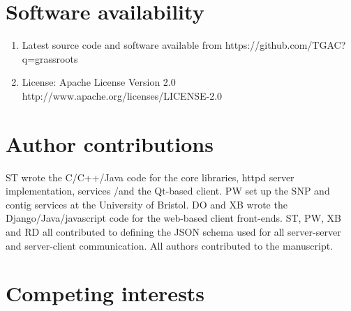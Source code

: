 \documentclass[9pt,a4paper]{extarticle}
\begin{document}
\section*{Software availability}

\begin{enumerate}
\item Latest source code and software available from https://github.com/TGAC?q=grassroots
\item License: Apache License Version 2.0 http://www.apache.org/licenses/LICENSE-2.0
\end{enumerate}

\section*{Author contributions}
ST wrote the C/C++/Java code for the core libraries, httpd server implementation, services /and the Qt-based client.
PW set up the SNP and contig services at the University of Bristol.
DO and XB wrote the Django/Java/javascript code for the web-based client front-ends.
ST, PW, XB and RD all contributed to defining the JSON schema used for all server-server and server-client communication.
All authors contributed to the manuscript.


\section*{Competing interests}
\end{document}
